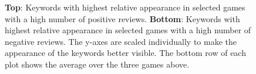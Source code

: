 \documentclass{article}
\theoremstyle{plain}
\theoremstyle{definition}
\theoremstyle{remark}
\begin{document}
\begin{figure}[!h]
  \centering
  
    \par

  \caption{\textbf{Top}: Keywords with highest relative appearance in selected games with a high number of positive reviews. \textbf{Bottom}: Keywords with highest relative appearance in selected games with a high number of negative reviews. The y-axes are scaled individually to make the appearance of the keywords better visible. The bottom row of each plot shows the average over the three games above.}
    \label{fig:wordcount}
\end{figure}
\end{document}
